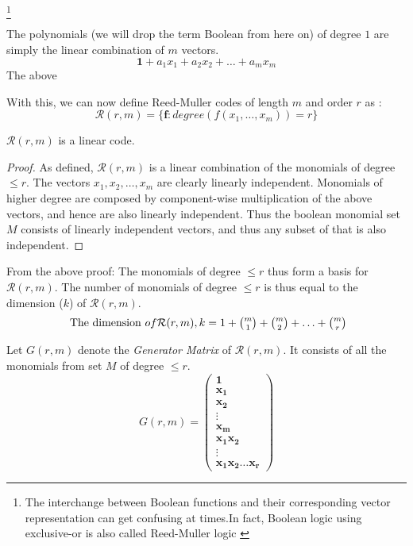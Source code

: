 \documentclass{article}
\newcommand{\RM}[2]{\ensuremath{\mathcal{R}(#1,#2)}}
\newcommand{\rem}{Reed-Muller}
\newcommand{\V}[1]{\ensuremath{\mathbf{#1}}}
\theoremstyle{plain}
\begin{document}
\footnote{The interchange between Boolean functions and their corresponding vector representation can get confusing at times.In fact, Boolean logic using exclusive-or is also called Reed-Muller logic \cite{rm-logic}}

The polynomials (we will drop the term Boolean from here on) of degree $1$ are simply the linear combination of $m$ vectors.
\begin{equation}
 \V{1}+a_1x_1+a_2x_2+\ldots+a_mx_m
\end{equation}
The above 

With this, we can now define \rem{} codes of length $m$ and order $r$  as :
\begin{equation}
\RM{r}{m} = \{\V{f} : degree(f(x_1,\ldots,x_m)) = r \} 
\end{equation}


\begin{lemma}
  $\RM{r}{m}$ is a linear code.
  \begin{proof}
As defined, $\RM{r}{m}$ is a linear combination of the monomials of degree $\leq r$. 
The vectors $x_1,x_2,\ldots,x_m$ are clearly linearly independent.
Monomials of higher degree are composed by component-wise multiplication of the above vectors, and hence are also linearly independent.
Thus the boolean monomial set $M$ consists of linearly independent vectors, and thus any subset of that is also independent. 
  \end{proof}
\end{lemma}

From the above proof:
The monomials of degree $\leq r$ thus form a basis for $\RM{r}{m}$. The number of monomials of degree $\leq r$ is thus equal to the dimension ($k$) of $\RM{r}{m}$.
\begin{equation}
  \label{eq:2}
  \text{ The dimension } of $\RM{r}{m}$ , k= 1+\binom{m}{1}+\binom{m}{2}+\ldots+\binom{m}{r}
\end{equation}

Let $G(r,m)$ denote the \emph{Generator Matrix} of $\RM{r}{m}$. It consists of all the monomials from set $M$ of degree $\leq r$.
\begin{equation}
  \label{eq:5}
  G(r,m) =
  \begin{pmatrix}
    \V{1} \\
    \V{x_1} \\
    \V{x_2} \\
    \vdots \\
    \V{x_m} \\
    \V{x_1x_2} \\
    \vdots \\
    \V{x_1x_2\ldots x_r}
  \end{pmatrix}
\end{equation}
\end{document}
